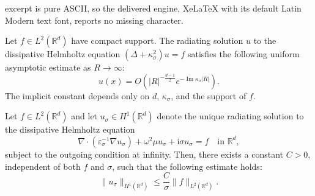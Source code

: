 \documentclass[10pt,a4paper]{amsart}
\begin{document}
excerpt is pure ASCII, so the delivered engine, XeLaTeX with its default Latin Modern text font, reports no missing character.
\begin{lemma}\label{lem:far-field}
Let $f \in L^2(\mathbb{R}^d)$ have compact support. The radiating solution $u$ to the dissipative Helmholtz equation $(\Delta + \kappa_\sigma^2)u = f$ satisfies the following uniform asymptotic estimate as $R \to \infty$:
\begin{equation*}
    u(x) = O\left( |R|^{-\frac{d-1}{2}} e^{-\operatorname{Im}\kappa_\sigma |R|} \right).
\end{equation*}
The implicit constant depends only on $d$, $\kappa_\sigma$, and the support of $f$.
\end{lemma}

\begin{proposition}\label{prop:uniform-estimate}
Let $f \in L^2(\mathbb{R}^d)$ and let $u_\sigma \in H^1(\mathbb{R}^d)$ denote the unique radiating solution to the dissipative Helmholtz equation
\begin{equation}\label{ge}
    \nabla \cdot (\varepsilon_\sigma^{-1} \nabla u_\sigma) + \omega^2 \mu u_\sigma + \mathrm{i}\sigma u_\sigma = f \quad \text{in } \mathbb{R}^d,
\end{equation}
subject to the outgoing condition at infinity. Then, there exists a constant $C > 0$, independent of both $f$ and $\sigma$, such that the following estimate holds:
\begin{equation*}
    \|u_\sigma\|_{H^1(\mathbb{R}^d)} \le \frac{C}{\sigma} \|f\|_{L^2(\mathbb{R}^d)}.
\end{equation*}
\end{proposition}
\end{document}
